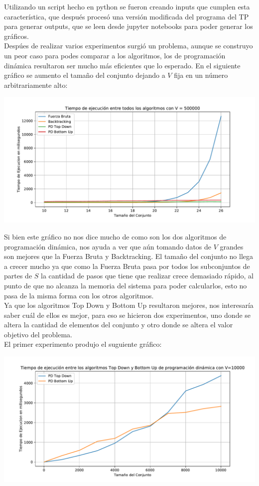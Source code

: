 \documentclass[a4paper]{article}
\begin{document}
Utilizando un script hecho en python se fueron creando inputs que cumplen esta característica, que después procesó una versión modificada del programa del TP para generar outputs, que se leen desde jupyter notebooks para poder generar los gráficos.
\\
Despúes de realizar varios experimentos surgió un problema, aunque se construyo un peor caso para podes comparar a los algoritmos, los de programación dinámica resultaron ser mucho más eficientes que lo esperado. En el siguiente gráfico se aumento el tamaño del conjunto dejando a $V$ fija en un número arbitrariamente alto:
\\
\begin{center}
	\includegraphics[width=.8\linewidth]{G3.pdf}
\end{center}

Si bien este gráfico no nos dice mucho de como son los dos algoritmos de programación dinámica, nos ayuda a ver que aún tomando datos de $V$ grandes son mejores que la Fuerza Bruta y Backtracking. El tamaño del conjunto no llega a crecer mucho ya que como la Fuerza Bruta pasa por todos los subconjuntos de partes de $S$ la cantidad de pasos que tiene que realizar crece demasiado rápido, al punto de que no alcanza la memoria del sistema para poder calcularlos, esto no pasa de la misma forma con los otros algoritmos.
\\
Ya que los algoritmos Top Down y Bottom Up resultaron mejores, nos interesaría saber cuál de ellos es mejor, para eso se hicieron dos experimentos, uno donde se altera la cantidad de elementos del conjunto y otro donde se altera el valor objetivo del problema.
\\
El primer experimento produjo el suguiente gráfico:

\begin{center}
	\includegraphics[width=.8\linewidth]{G2.pdf}
\end{center}
\end{document}
